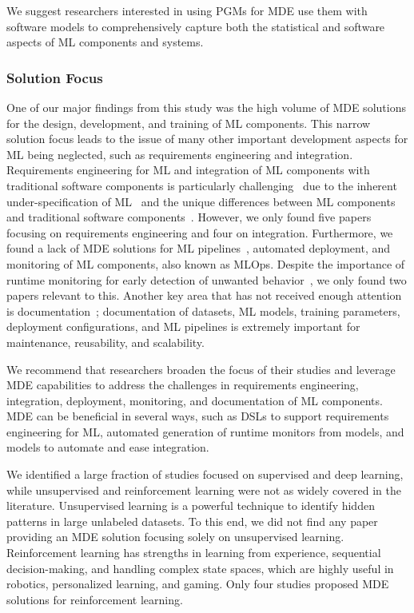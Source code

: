 We suggest researchers interested in using PGMs for MDE use them with software models to comprehensively capture both the statistical and software aspects of ML components and systems. 

\subsubsection{Solution Focus}

 One of our major findings from this study was the high volume of MDE solutions for the design, development, and training of ML components. This narrow solution focus leads to the issue of many other important development aspects for ML being neglected, such as requirements engineering and integration. Requirements engineering for ML and integration of ML components with traditional software components is particularly challenging~\cite{ahmad2023requirements, atouani2021artifact} due to the inherent under-specification of ML~\cite{d2022underspecification} and the unique differences between ML components and traditional software components~\cite{atouani2021artifact,kusmenko2019modeling}. However, we only found five papers focusing on requirements engineering and four on integration. Furthermore, we found a lack of MDE solutions for ML pipelines~\cite{raedler2023model}, automated deployment, and monitoring of ML components, also known as MLOps. Despite the importance of runtime monitoring for early detection of unwanted behavior~\cite{nigenda2022amazon}, we only found two papers relevant to this. Another key area that has not received enough attention is documentation~\cite{giner2023domain}; documentation of datasets, ML models, training parameters, deployment configurations, and ML pipelines is extremely important for maintenance, reusability, and scalability. 

We recommend that researchers broaden the focus of their studies and leverage MDE capabilities to address the challenges in requirements engineering, integration, deployment, monitoring, and documentation of ML components. MDE can be beneficial in several ways, such as DSLs to support requirements engineering for ML, automated generation of runtime monitors from models, and models to automate and ease integration.

 We identified a large fraction of studies focused on supervised and deep learning, while unsupervised and reinforcement learning were not as widely covered in the literature. Unsupervised learning is a powerful technique to identify hidden patterns in large unlabeled datasets. To this end, we did not find any paper providing an MDE solution focusing solely on unsupervised learning. Reinforcement learning has strengths in learning from experience, sequential decision-making, and handling complex state spaces, which are highly useful in robotics, personalized learning, and gaming. Only four studies proposed MDE solutions for reinforcement learning. 

